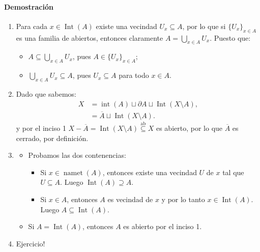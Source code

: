 \paragraph{Demostración}
\begin{enumerate}[label=\arabic*)]
  \item Para cada $x\in\operatorname{Int}(A)$ existe una vecindad $U_x\subseteq A$, por lo que si $\{U_x\}_{x\in A}$ es una familia de abiertos, entonces claramente $A=\bigcup_{x\in A}U_x$. Puesto que:
  \begin{itemize}
    \item[$\subseteq$] $A \subseteq \bigcup_{x\in A}U_x$, pues $A \in \{U_x\}_{x\in A}$;
    \item[$\supseteq$] $\bigcup_{x\in A}U_x \subseteq A$, pues $U_x \subseteq A$ para todo $x\in A$.
  \end{itemize}
  \item Dado que sabemos:
  \begin{align*}
      X&=\operatorname{int}{(A)}\sqcup \partial A \sqcup \operatorname{Int}(X\setminus A),\\
      &=\overline A \sqcup \operatorname{Int}(X\setminus A).
  \end{align*}
  y por el inciso 1 $X-\overline A = \operatorname{Int}(X\setminus A) \overset{\text{ab}}\subseteq X$ es abierto, por lo que $\overline A$ es cerrado, por definición.
  \item 
    \begin{itemize}
        \item[$\implies$] Probamos las dos contenencias:
        
        \begin{itemize}
            \item[$\supseteq$] Si $x\in \operatorname{namet}(A)$, entonces existe una vecindad $U$ de $x$ tal que $U \subseteq A$. Luego $\operatorname{Int}(A) \supseteq A$.
            \item[$\subseteq$] Si $x\in A$, entonces $A$ es vecindad de $x$ y por lo tanto $x\in \operatorname{Int}(A)$. Luego $A \subseteq \operatorname{Int}(A)$.
        \end{itemize}
        \item[$\impliedby$] Si $A = \operatorname{Int}(A)$, entonces $A$ es abierto por el inciso 1.
    \end{itemize}
    \item Ejercicio!
\end{enumerate}

